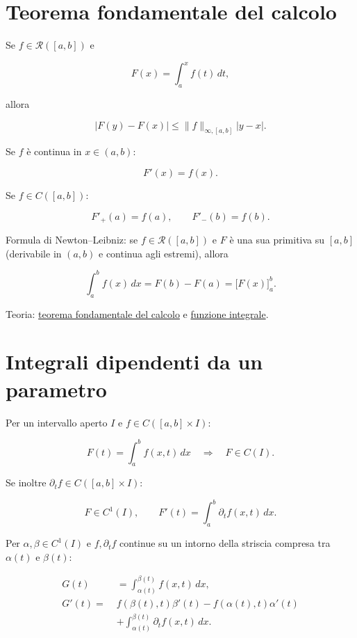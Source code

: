 \section{Teorema fondamentale del calcolo}\label{teorema-fondamentale-del-calcolo}

Se \(f\in\mathcal R([a,b])\) e

\[
\displaystyle
F(x)=\int_a^x f(t)\,dt,
\]

allora

\[
\displaystyle
\lvert F(y)-F(x)\rvert
\le
\lVert f\rVert_{\infty,[a,b]}\lvert y-x\rvert.
\]

Se \(f\) è continua in \(x\in(a,b)\):

\[
\displaystyle
F'(x)=f(x).
\]

Se \(f\in C([a,b])\):

\[
\displaystyle
F'_+(a)=f(a),
\qquad
F'_-(b)=f(b).
\]

Formula di Newton--Leibniz: se \(f\in\mathcal R([a,b])\) e \(F\) è una sua primitiva su \([a,b]\) (derivabile in \((a,b)\) e continua agli estremi), allora

\[
\displaystyle
\int_a^b f(x)\,dx
=
F(b)-F(a)
=
\bigl[F(x)\bigr]_a^b.
\]

Teoria: \href{https://ingegnerismo.it/matematica/teorema-fondamentale-calcolo/}{teorema fondamentale del calcolo} e \href{https://ingegnerismo.it/matematica/funzione-integrale/}{funzione integrale}.

\section{Integrali dipendenti da un parametro}\label{integrali-dipendenti-da-un-parametro}

Per un intervallo aperto \(I\) e \(f\in C([a,b]\times I)\):

\[
F(t)=\int_a^b f(x,t)\,dx
\quad\Longrightarrow\quad
F\in C(I).
\]

Se inoltre \(\partial_t f\in C([a,b]\times I)\):

\[
F\in C^1(I),
\qquad
F'(t)=\int_a^b\partial_t f(x,t)\,dx.
\]

Per \(\alpha,\beta\in C^1(I)\) e \(f,\partial_t f\) continue su un intorno della striscia compresa tra \(\alpha(t)\) e \(\beta(t)\):

\[
\begin{aligned}
G(t)&=\int_{\alpha(t)}^{\beta(t)}f(x,t)\,dx,\\
G'(t)
=\;&f(\beta(t),t)\beta'(t)
-f(\alpha(t),t)\alpha'(t)\\
&+\int_{\alpha(t)}^{\beta(t)}
\partial_t f(x,t)\,dx.
\end{aligned}
\]

